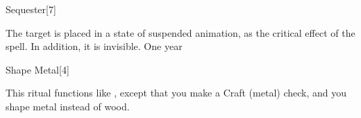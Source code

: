 \begin{spellsection}{Sequester}[7]
    \begin{spellheader}
    \end{spellheader}
    \begin{spellcontent}
        \begin{spelltargetinginfo}
        \end{spelltargetinginfo}
        \begin{spelleffects}
            \spelleffect The target is placed in a state of suspended animation, as the critical effect of the  spell. In addition, it is invisible.
            \spelldur One year
        \end{spelleffects}
    \end{spellcontent}
    \begin{spellfooter}
    \end{spellfooter}
    \begin{spellaugments}
    \end{spellaugments}
\end{spellsection}

\begin{spellsection}{Shape Metal}[4]
    \begin{spellheader}
    \end{spellheader}
    \begin{spellcontent}
        \begin{spelltargetinginfo}
        \end{spelltargetinginfo}
        \begin{spelleffects}
            \spellspecial This ritual functions like , except that you make a Craft (metal) check, and you shape metal instead of wood.
        \end{spelleffects}
    \end{spellcontent}
    \begin{spellfooter}
    \end{spellfooter}
\end{spellsection}

